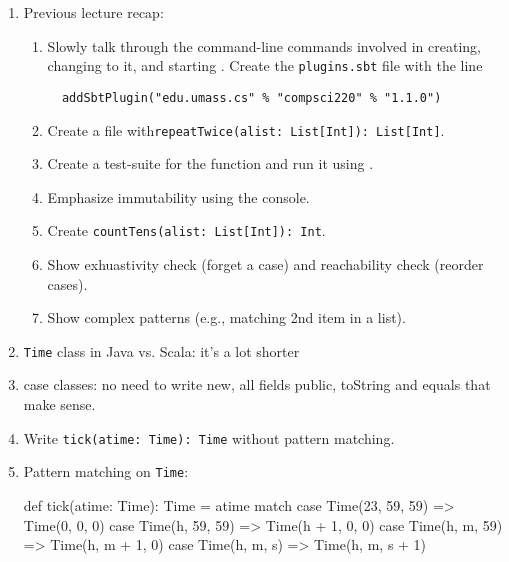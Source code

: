 \documentclass[9pt]{extbook}
\begin{document}
\begin{enumerate}

  \item Previous lecture recap:

\begin{enumerate}

  \item Slowly talk through the command-line commands involved in
  creating, changing to it, and starting \sbt{}. Create
  the \texttt{plugins.sbt} file with the line

  \begin{lstlisting}
  addSbtPlugin("edu.umass.cs" % "compsci220" % "1.1.0")
  \end{lstlisting}

  \item Create a file with\lstinline|repeatTwice(alist: List[Int]): List[Int]|.

  \item Create a test-suite for the function and run it using \sbt{}.

  \item Emphasize immutability using the console.

  \item Create \lstinline|countTens(alist: List[Int]): Int|.

  \item Show exhuastivity check (forget a case) and reachability check (reorder cases).

  \item Show complex patterns (e.g., matching 2nd item in a list).

\end{enumerate}

  \item \lstinline|Time| class in Java vs. Scala: it's a lot shorter

  \item case classes: no need to write new, all fields public, toString and equals that make sense.

  \item Write \lstinline|tick(atime: Time): Time| without pattern matching.

  \item Pattern matching on \lstinline|Time|:

  \begin{scalacode}
  def tick(atime: Time): Time = atime match {
    case Time(23, 59, 59) => Time(0, 0, 0)
    case Time(h, 59, 59) => Time(h + 1, 0, 0)
    case Time(h, m, 59) => Time(h, m + 1, 0)
    case Time(h, m, s) => Time(h, m, s + 1)
  }
  \end{scalacode}


\end{enumerate}
\end{document}
